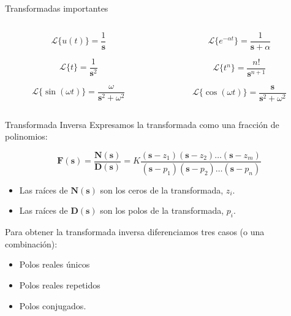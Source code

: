 \documentclass[aspectratio=169, usenames,svgnames,dvipsnames]{beamer}
\newcommand{\laplace}[1]{\mathbf{#1}(\mathbf{s})}
\newcommand{\slp}{\mathbf{s}}
\begin{document}
\begin{frame}[label={sec:orgdd476a0}]{Transformadas importantes}
\begin{columns}
\begin{column}{0.5\columnwidth}
\[
\mathcal{L}\{u(t)\} = \frac{1}{\slp}
\]

\[
\mathcal{L}\{t\} = \frac{1}{\slp^2}
\]

\[
  \mathcal{L}\{\sin(\omega t)\} = \frac{\omega}{\slp^2 + \omega^2}
\]
\end{column}

\begin{column}{0.5\columnwidth}
\[
\mathcal{L}\{e^{-\alpha t}\} = \frac{1}{\slp + \alpha}
\]


\[
\mathcal{L}\{t^n\} = \frac{n!}{\slp^{ n+1}}
\]

\[
  \mathcal{L}\{\cos(\omega t)\} = \frac{\slp}{\slp^2 + \omega^2}
\]
\end{column}
\end{columns}
\end{frame}

\begin{frame}[label={sec:orgbb4332f}]{Transformada Inversa}
Expresamos la transformada como una fracción de polinomios:

\[
  \laplace{F} = \frac{\laplace{N}}{\laplace{D}} = K \frac{(\slp-z_1) (\slp - z_2) \ldots (\slp - z_m)}{(\slp-p_1) (\slp - p_2) \ldots (\slp - p_n)}
\]

\begin{itemize}
\item Las raíces de \(\laplace{N}\) son los \alert{ceros} de la transformada, \(z_i\).
\item Las raíces de \(\laplace{D}\) son los \alert{polos} de la transformada, \(p_i\).
\end{itemize}

\vspace{\baselineskip}

Para obtener la transformada inversa diferenciamos tres casos (o una combinación): 
\begin{itemize}
\item Polos reales únicos
\item Polos reales repetidos
\item Polos conjugados.
\end{itemize}
\end{frame}
\end{document}
